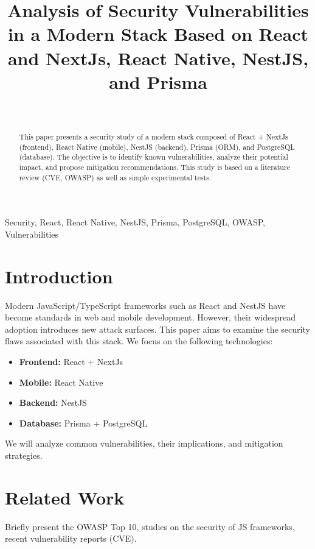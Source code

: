 \documentclass[conference]{IEEEtran}
\title{Analysis of Security Vulnerabilities in a Modern Stack Based on React and NextJs, React Native, NestJS, and Prisma}
\author{
    \IEEEauthorblockN{STROUN Elie}
    \IEEEauthorblockA{Epitech Rennes\\
    elie.stroun@epitech.eu}

    \newline
    \\
    \IEEEauthorblockA{Contributors: Nathan Jeannot, Manech Dubreil, Aymeric Jouannet-Mimy, Pablo Jesus}
}
\begin{document}
\maketitle

\begin{abstract}
This paper presents a security study of a modern stack composed of React + NextJs (frontend), React Native (mobile), NestJS (backend), Prisma (ORM), and PostgreSQL (database). The objective is to identify known vulnerabilities, analyze their potential impact, and propose mitigation recommendations. This study is based on a literature review (CVE, OWASP) as well as simple experimental tests.
\end{abstract}

\begin{IEEEkeywords}
Security, React, React Native, NestJS, Prisma, PostgreSQL, OWASP, Vulnerabilities
\end{IEEEkeywords}

\section{Introduction}
Modern JavaScript/TypeScript frameworks such as React and NestJS have become standards in web and mobile development. However, their widespread adoption introduces new attack surfaces. This paper aims to examine the security flaws associated with this stack. We focus on the following technologies:
\begin{itemize}
    \item \textbf{Frontend:} React + NextJs
    \item \textbf{Mobile:} React Native
    \item \textbf{Backend:} NestJS
    \item \textbf{Database:} Prisma + PostgreSQL
\end{itemize}
We will analyze common vulnerabilities, their implications, and mitigation strategies.

\section{Related Work}
Briefly present the OWASP Top 10, studies on the security of JS frameworks, recent vulnerability reports (CVE).
\end{document}
